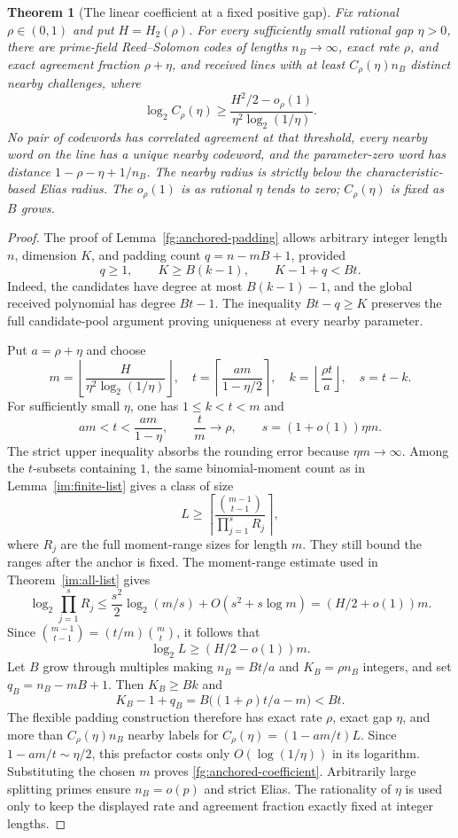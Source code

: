 \documentclass[11pt,letterpaper]{article}
\newtheorem{theorem}{Theorem}[section]
\theoremstyle{definition}
\theoremstyle{remark}
\begin{document}
\begin{theorem}[The linear coefficient at a fixed positive gap]
\label{fg:anchored-fixed-gap}
Fix rational $\rho\in(0,1)$ and put $H=H_2(\rho)$.
For every sufficiently small rational gap $\eta>0$, there are prime-field
Reed--Solomon codes of lengths $n_B\to\infty$, exact rate $\rho$,
and exact agreement fraction $\rho+\eta$, and received lines with
at least $C_\rho(\eta)n_B$ distinct nearby challenges, where
\begin{equation}\label{fg:anchored-coefficient}
 \log_2 C_\rho(\eta)\ge
 \frac{H^2/2-o_\rho(1)}{\eta^2\log_2(1/\eta)}.
\end{equation}
No pair of codewords has correlated agreement at that threshold,
every nearby word on the line has a unique nearby codeword, and the
parameter-zero word has distance $1-\rho-\eta+1/n_B$.
The nearby radius is strictly below the characteristic-based Elias radius.
The $o_\rho(1)$ is as rational $\eta$ tends to zero;
$C_\rho(\eta)$ is fixed as $B$ grows.
\end{theorem}
\begin{proof}
The proof of Lemma~\ref{fg:anchored-padding} allows arbitrary integer
length $n$, dimension $K$, and padding count $q=n-mB+1$, provided
\[
 q\ge1,\qquad K\ge B(k-1),\qquad K-1+q<Bt.
\]
Indeed, the candidates have degree at most $B(k-1)-1$, and the global
received polynomial has degree $Bt-1$. The inequality $Bt-q\ge K$
preserves the full candidate-pool
argument proving uniqueness at every nearby parameter.

Put $a=\rho+\eta$ and choose
\[
 m=\left\lfloor\frac{H}{\eta^2\log_2(1/\eta)}\right\rfloor,
 \quad t=\left\lceil\frac{am}{1-\eta/2}\right\rceil,
 \quad k=\left\lfloor\frac{\rho t}{a}\right\rfloor,
 \quad s=t-k.
\]
For sufficiently small $\eta$, one has $1\le k<t<m$ and
\[
 am<t<\frac{am}{1-\eta},\qquad
 \frac tm\to\rho,\qquad s=(1+o(1))\eta m.
\]
The strict upper inequality absorbs the rounding error because
$\eta m\to\infty$. Among the $t$-subsets containing $1$,
the same binomial-moment count as in Lemma~\ref{im:finite-list}
gives a class of size
\[
 L\ge\left\lceil\frac{\binom{m-1}{t-1}}
 {\prod_{j=1}^s R_j}\right\rceil,
\]
where $R_j$ are the full moment-range sizes for length $m$.
They still bound the ranges after the anchor is fixed.
The moment-range estimate used in Theorem~\ref{im:all-list} gives
\[
 \log_2\prod_{j=1}^s R_j
 \le\frac{s^2}{2}\log_2(m/s)+O(s^2+s\log m)
 =(H/2+o(1))m.
\]
Since $\binom{m-1}{t-1}=(t/m)\binom mt$, it follows that
\[
 \log_2 L\ge(H/2-o(1))m.
\]
Let $B$ grow through multiples making $n_B=Bt/a$ and $K_B=\rho n_B$
integers, and set $q_B=n_B-mB+1$. Then $K_B\ge Bk$ and
\[
 K_B-1+q_B=B\bigl((1+\rho)t/a-m\bigr)<Bt.
\]
The flexible padding construction therefore has exact rate $\rho$,
exact gap $\eta$, and more than $C_\rho(\eta)n_B$ nearby labels for
$C_\rho(\eta)=(1-am/t)L$. Since $1-am/t\sim\eta/2$, this
prefactor costs only $O(\log(1/\eta))$ in its logarithm.
Substituting the chosen $m$ proves \eqref{fg:anchored-coefficient}.
Arbitrarily large splitting primes ensure $n_B=o(p)$ and strict Elias.
The rationality of $\eta$ is used only to keep the displayed rate
and agreement fraction exactly fixed at integer lengths.
\end{proof}
\end{document}

